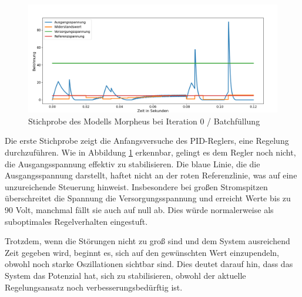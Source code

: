 \begin{figure}[htbp]
\centering
\includegraphics[width=\textwidth]{4Ergebnisse/Phasen/2Phase/5_I.png}
\caption{Stichprobe des Modells Morpheus bei Iteration 0 / Batchfüllung}
\label{fig:untrained}
\end{figure}


Die erste Stichprobe zeigt die Anfangsversuche des PID-Reglers, eine Regelung durchzuführen. Wie in Abbildung \ref{fig:untrained} erkennbar, gelingt es dem Regler noch nicht, die Ausgangsspannung effektiv zu stabilisieren. Die blaue Linie, die die Ausgangsspannung darstellt, haftet nicht an der roten Referenzlinie, was auf eine unzureichende Steuerung hinweist. Insbesondere bei großen Stromspitzen überschreitet die Spannung die Versorgungsspannung und erreicht Werte bis zu 90 Volt, manchmal fällt sie auch auf null ab. Dies würde normalerweise als suboptimales Regelverhalten eingestuft.

Trotzdem, wenn die Störungen nicht zu groß sind und dem System ausreichend Zeit gegeben wird, beginnt es, sich auf den gewünschten Wert einzupendeln, obwohl noch starke Oszillationen sichtbar sind. Dies deutet darauf hin, dass das System das Potenzial hat, sich zu stabilisieren, obwohl der aktuelle Regelungsansatz noch verbesserungsbedürftig ist.
